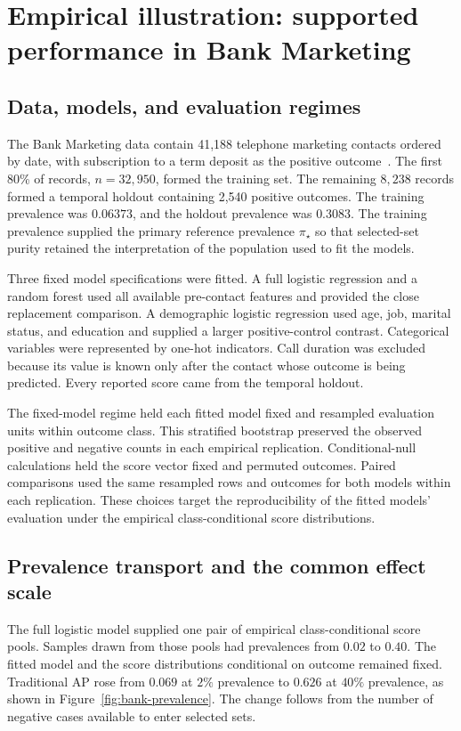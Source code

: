 \documentclass[11pt]{article}
\theoremstyle{remark}
\begin{document}
\section{Empirical illustration: supported performance in Bank Marketing}
\label{sec:bank-marketing}

\subsection{Data, models, and evaluation regimes}

The Bank Marketing data contain 41,188 telephone marketing contacts ordered by date, with subscription to a term deposit as the positive outcome~\cite{moro2014bank}. The first 80\% of records, $n=32{,}950$, formed the training set. The remaining $8{,}238$ records formed a temporal holdout containing 2,540 positive outcomes. The training prevalence was $0.06373$, and the holdout prevalence was $0.3083$. The training prevalence supplied the primary reference prevalence $\pi_\star$ so that selected-set purity retained the interpretation of the population used to fit the models.

Three fixed model specifications were fitted. A full logistic regression and a random forest used all available pre-contact features and provided the close replacement comparison. A demographic logistic regression used age, job, marital status, and education and supplied a larger positive-control contrast. Categorical variables were represented by one-hot indicators. Call duration was excluded because its value is known only after the contact whose outcome is being predicted. Every reported score came from the temporal holdout.

The fixed-model regime held each fitted model fixed and resampled evaluation units within outcome class. This stratified bootstrap preserved the observed positive and negative counts in each empirical replication. Conditional-null calculations held the score vector fixed and permuted outcomes. Paired comparisons used the same resampled rows and outcomes for both models within each replication. These choices target the reproducibility of the fitted models' evaluation under the empirical class-conditional score distributions.

\subsection{Prevalence transport and the common effect scale}

The full logistic model supplied one pair of empirical class-conditional score pools. Samples drawn from those pools had prevalences from $0.02$ to $0.40$. The fitted model and the score distributions conditional on outcome remained fixed. Traditional AP rose from $0.069$ at $2\%$ prevalence to $0.626$ at $40\%$ prevalence, as shown in Figure~\ref{fig:bank-prevalence}. The change follows from the number of negative cases available to enter selected sets.
\end{document}
